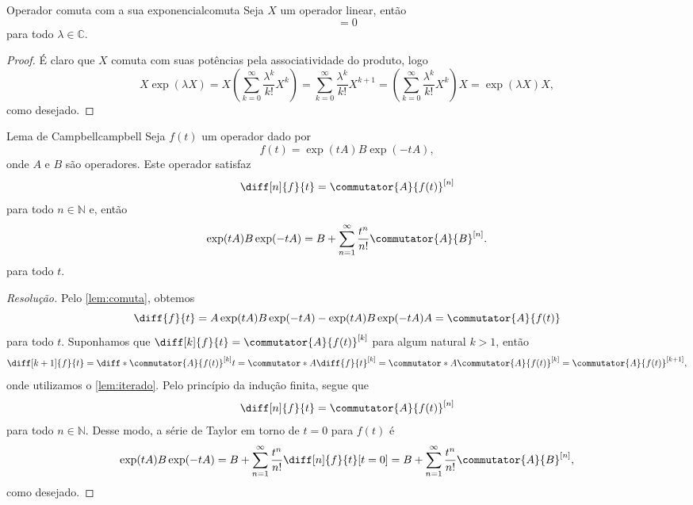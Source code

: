 \begin{lemma}{Operador comuta com a sua exponencial}{comuta}
    Seja \(X\) um operador linear, então
    \begin{equation*}
        [X, \exp(\lambda X)] = 0
    \end{equation*}
    para todo \(\lambda \in \mathbb{C}\).
\end{lemma}
\begin{proof}
    É claro que \(X\) comuta com suas potências pela associatividade do produto, logo
    \begin{equation*}
        X \exp(\lambda X) = X \left(\sum_{k=0}^\infty \frac{\lambda^k}{k!}X^k\right) = \sum_{k=0}^\infty \frac{\lambda^k}{k!}X^{k+1} = \left(\sum_{k=0}^\infty \frac{\lambda^k}{k!}X^k\right)X = \exp(\lambda X) X,
    \end{equation*}
    como desejado.
\end{proof}

\begin{lemma}{Lema de Campbell}{campbell}
    Seja \(f(t)\) um operador dado por
    \begin{equation*}
        f(t) = \exp(tA) B\exp(-tA),
    \end{equation*}
    onde \(A\) e \(B\) são operadores. Este operador satisfaz
    \begin{equation*}
        \diff[n]{f}{t} = \commutator{A}{f(t)}^{[n]}
    \end{equation*}
    para todo \(n \in \mathbb{N}\) e, então
    \begin{equation*}
        \exp(tA)B\exp(-tA) = B + \sum_{n = 1}^\infty \frac{t^n}{n!}\commutator{A}{B}^{[n]}.
    \end{equation*}
    para todo \(t.\)
\end{lemma}
\begin{proof}[Resolução]
    Pelo \cref{lem:comuta}, obtemos
    \begin{equation*}
        \diff{f}{t} = A \exp(tA) B\exp(-tA) - \exp(tA) B\exp(-tA) A = \commutator{A}{f(t)}
    \end{equation*}
    para todo \(t\). Suponhamos que \(\diff[k]{f}{t} = \commutator{A}{f(t)}^{[k]}\) para algum natural \(k > 1\), então
    \begin{equation*}
        \diff[k+1]{f}{t} = \diff*{\commutator{A}{f(t)}^{[k]}}{t} = \commutator*{A}{\diff{f}{t}}^{[k]} = \commutator*{A}{\commutator{A}{f(t)}}^{[k]} = \commutator{A}{f(t)}^{[k+1]},
    \end{equation*}
    onde utilizamos o \cref{lem:iterado}. Pelo princípio da indução finita, segue que
    \begin{equation*}
        \diff[n]{f}{t} = \commutator{A}{f(t)}^{[n]}
    \end{equation*}
    para todo \(n \in \mathbb{N}\). Desse modo, a série de Taylor em torno de \(t = 0\) para \(f(t)\) é
    \begin{equation*}
        \exp(tA)B\exp(-tA) = B + \sum_{n = 1}^{\infty} \frac{t^n}{n!}\diff[n]{f}{t}[t=0] = B + \sum_{n = 1}^{\infty} \frac{t^n}{n!}\commutator{A}{B}^{[n]},
    \end{equation*}
    como desejado.
\end{proof}

